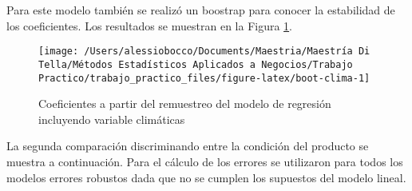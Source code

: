 \documentclass[
  12pt]{article}
\begin{document}
Para este modelo también se realizó un boostrap para conocer la estabilidad de los coeficientes. Los resultados se muestran en la Figura \ref{fig:boot-clima}.

\begin{figure}

{\centering \texttt{[image: /Users/alessiobocco/Documents/Maestria/Maestría Di Tella/Métodos Estadísticos Aplicados a Negocios/Trabajo Practico/trabajo\_practico\_files/figure-latex/boot-clima-1]} 

}

\caption{Coeficientes a partir del remuestreo del modelo de regresión incluyendo variable climáticas}\label{fig:boot-clima}
\end{figure}

La segunda comparación discriminando entre la condición del producto se muestra a continuación. Para el cálculo de los errores se utilizaron para todos los modelos errores robustos dada que no se cumplen los supuestos del modelo lineal.
\end{document}
